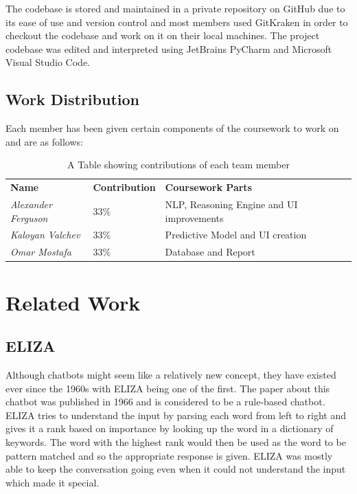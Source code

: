 \documentclass[11pt]{article}
\begin{document}
    The codebase is stored and maintained in a private repository on GitHub due to its ease of use and version control and most members used GitKraken in order to checkout the codebase and work on it on their local machines. The project codebase was edited and interpreted using JetBrains PyCharm and Microsoft Visual Studio Code.

    \subsection{Work Distribution}
    Each member has been given certain components of the coursework to work on and are as follows:

    \begin{table}[h]
    \begin{tabular}{lllll}
    \textbf{Name}               & \textbf{Contribution} & \textbf{Coursework Parts}                     &  &  \\
    \textit{Alexander Ferguson} & 33\%                  & NLP, Reasoning Engine and UI     improvements &  &  \\
    \textit{Kaloyan Valchev}    & 33\%                  & Predictive Model and UI     creation          &  &  \\
    \textit{Omar Mostafa}       & 33\%                  & Database and Report                           &  & 
    \end{tabular}
    \caption{A Table showing contributions of each team member}
    \label{tab:contribTable}
    \end{table}
    

\section{Related Work}
    \subsection{ELIZA}
    Although chatbots might seem like a relatively new concept, they have existed ever since the 1960s with ELIZA being one of the first. The paper about this chatbot was published in 1966 and is considered to be a rule-based chatbot. ELIZA tries to understand the input by parsing each word from left to right and gives it a rank based on importance by looking up the word in a dictionary of keywords. The word with the highest rank would then be used as the word to be pattern matched and so the appropriate response is given. ELIZA was mostly able to keep the conversation going even when it could not understand the input which made it special. \citep{ELIZA1966chatbot}
\end{document}
